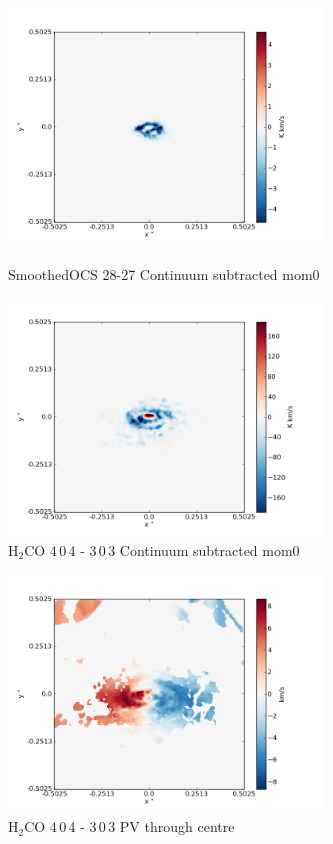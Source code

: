 \documentclass[useAMS,usenatbib]{mn2e}
\begin{document}
\begin{figure}
 \includegraphics[width=84mm]{Figures/sim/imagesmoothedOCS_28-27_30deg_contSub.png}
 \label{smoothOCS_mom0}
 \caption{SmoothedOCS 28-27 Continuum subtracted mom0}
\end{figure}


 
%

\begin{figure}
 \includegraphics[width=84mm]{Figures/sim/imageH2CO_4-0-4->3-0-3_30deg_contSub.png}

 \caption{H$_2$CO 4$\,$0$\,$4 - 3$\,$0$\,$3 Continuum subtracted mom0}
\end{figure}

\begin{figure}
 \includegraphics[width=84mm]{Figures/sim/imageH2CO_4-0-4->3-0-3_30deg_mom1.png}

 \caption{H$_2$CO 4$\,$0$\,$4 - 3$\,$0$\,$3 PV through centre}
\end{figure}
\end{document}
